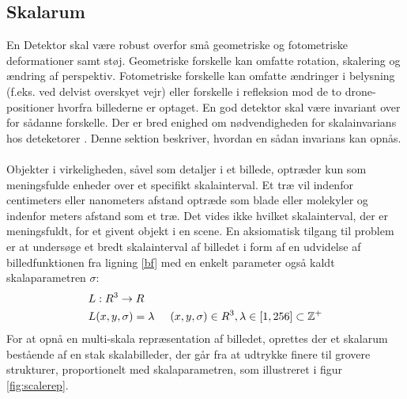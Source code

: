 \subsection{Skalarum}
En Detektor skal være robust overfor små geometriske og fotometriske deformationer samt støj. Geometriske forskelle kan omfatte rotation, skalering og ændring af perspektiv.  Fotometriske forskelle kan omfatte ændringer i belysning (f.eks. ved delvist overskyet vejr) eller forskelle i refleksion mod de to drone-positioner hvorfra billederne er optaget. En god detektor skal være invariant over for sådanne forskelle. Der er bred enighed om nødvendigheden for skalainvarians hos deteketorer \cite{koen} \cite{blob} \cite{lindenscale}. Denne sektion beskriver, hvordan en sådan invarians kan opnås. \\ \\
Objekter i virkeligheden, såvel som detaljer i et billede, optræder kun som meningsfulde enheder over et specifikt skalainterval. Et træ vil indenfor centimeters eller nanometers afstand optræde som blade eller molekyler og indenfor meters afstand som et træ. 
Det vides ikke hvilket skalainterval, der er meningsfuldt, for et givent objekt i en scene. 
En aksiomatisk tilgang til problem er at undersøge et bredt skalainterval af billedet i form af en udvidelse af billedfunktionen fra ligning \eqref{bf} med en enkelt parameter også kaldt skalaparametren $\sigma$:
\begin{equation}
\begin{split}
&L: R^3 \rightarrow R \\
&L(x,y,\sigma) = \lambda \hspace{0.5 cm} (x,y,\sigma)\in R^3, \lambda \in [1,256] \subset \mathbb{Z^+}
\end{split}
\end{equation}
For at opnå en multi-skala repræsentation af billedet, oprettes der et skalarum bestående af en stak skalabilleder, der går fra at udtrykke finere til grovere strukturer, proportionelt med skalaparametren, som illustreret i figur \ref{fig:scalerep}. 
